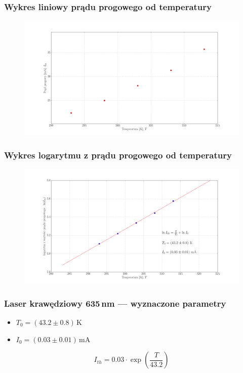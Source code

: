 \documentclass[xcolor={dvipsnames,table}]{beamer}
\begin{document}
\begin{frame}
\frametitle{Wykres liniowy prądu progowego od temperatury}
\center
\begin{figure}
   \includegraphics[width=1.10\textwidth,natwidth=69,natheight=87]{635/plot_lin_i_th.png}
\end{figure}
\end{frame}

\begin{frame}
\frametitle{Wykres logarytmu z prądu progowego od temperatury}
\center
\begin{figure}
   \includegraphics[width=1.10\textwidth,natwidth=69,natheight=87]{635/fit_i_0.png}
\end{figure}
\end{frame}

\begin{frame}
\frametitle{Laser krawędziowy 635\,nm --- wyznaczone parametry}
\begin{itemize}
\item $T_0 = (43.2 \pm 0.8)$\,K
\item $I_0 = (0.03 \pm 0.01)$\,mA
\end{itemize}
\begin{equation*}
I_{th} = 0.03 \cdot \exp \left( \frac{T}{43.2} \right)
\end{equation*}
\end{frame}
\end{document}
